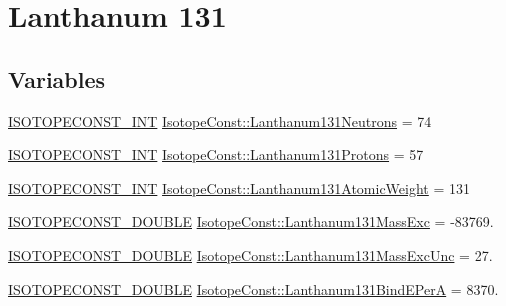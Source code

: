 \hypertarget{group___isotope_const-_lanthanum-_la131}{}\section{Lanthanum 131}
\label{group___isotope_const-_lanthanum-_la131}
\subsection*{Variables}
\begin{DoxyCompactItemize}
\item 
\mbox{\hyperlink{group___isotope_const-_macros_ga5f18360b3e99483a35c32d789e62621c}{I\+S\+O\+T\+O\+P\+E\+C\+O\+N\+S\+T\+\_\+\+I\+NT}} \mbox{\hyperlink{group___isotope_const-_lanthanum-_la131_gaed1d67ee75a54ac30db9477165f2f3fb}{Isotope\+Const\+::\+Lanthanum131\+Neutrons}} = 74
\item 
\mbox{\hyperlink{group___isotope_const-_macros_ga5f18360b3e99483a35c32d789e62621c}{I\+S\+O\+T\+O\+P\+E\+C\+O\+N\+S\+T\+\_\+\+I\+NT}} \mbox{\hyperlink{group___isotope_const-_lanthanum-_la131_ga4e482ac197a810f50d8d1382e83509f2}{Isotope\+Const\+::\+Lanthanum131\+Protons}} = 57
\item 
\mbox{\hyperlink{group___isotope_const-_macros_ga5f18360b3e99483a35c32d789e62621c}{I\+S\+O\+T\+O\+P\+E\+C\+O\+N\+S\+T\+\_\+\+I\+NT}} \mbox{\hyperlink{group___isotope_const-_lanthanum-_la131_gaa832c4458611d092c620b17cc1eae20a}{Isotope\+Const\+::\+Lanthanum131\+Atomic\+Weight}} = 131
\item 
\mbox{\hyperlink{group___isotope_const-_macros_ga8f45a7272ce02c0b4c65c44636ed719a}{I\+S\+O\+T\+O\+P\+E\+C\+O\+N\+S\+T\+\_\+\+D\+O\+U\+B\+LE}} \mbox{\hyperlink{group___isotope_const-_lanthanum-_la131_gaa90da27fe629a14c7490727e40910877}{Isotope\+Const\+::\+Lanthanum131\+Mass\+Exc}} = -\/83769.
\item 
\mbox{\hyperlink{group___isotope_const-_macros_ga8f45a7272ce02c0b4c65c44636ed719a}{I\+S\+O\+T\+O\+P\+E\+C\+O\+N\+S\+T\+\_\+\+D\+O\+U\+B\+LE}} \mbox{\hyperlink{group___isotope_const-_lanthanum-_la131_gaf0f2565b5dba3902a3e99fa0b2f4bffa}{Isotope\+Const\+::\+Lanthanum131\+Mass\+Exc\+Unc}} = 27.
\item 
\mbox{\hyperlink{group___isotope_const-_macros_ga8f45a7272ce02c0b4c65c44636ed719a}{I\+S\+O\+T\+O\+P\+E\+C\+O\+N\+S\+T\+\_\+\+D\+O\+U\+B\+LE}} \mbox{\hyperlink{group___isotope_const-_lanthanum-_la131_ga96be86a11dc90d0ed0dd0cb68741fbc4}{Isotope\+Const\+::\+Lanthanum131\+Bind\+E\+PerA}} = 8370.
\item 

\end{DoxyCompactItemize}
